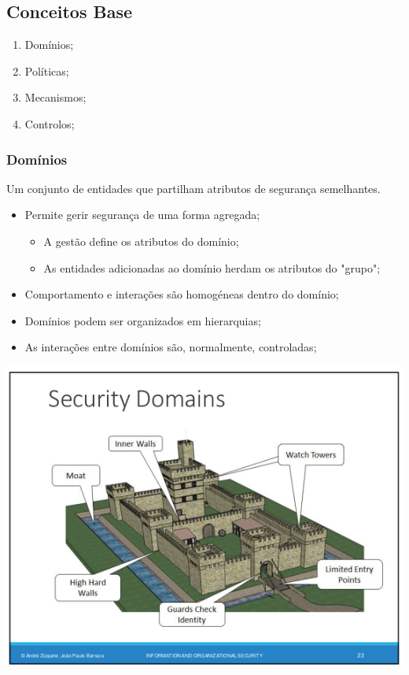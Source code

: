 \documentclass{article}
\begin{document}
\subsection{Conceitos Base}

\begin{enumerate}
  \item Domínios;
  \item Políticas;
  \item Mecanismos;
  \item Controlos;
\end{enumerate}

\subsubsection{Domínios}

Um conjunto de entidades que partilham atributos de segurança semelhantes.

\begin{flushleft}
  \begin{itemize}
    \item Permite gerir segurança de uma forma agregada;
    \begin{itemize}
      \item A gestão define os atributos do domínio;
      \item As entidades adicionadas ao domínio herdam os atributos do "grupo";
    \end{itemize}
    \item Comportamento e interações são homogéneas dentro do domínio;
    \item Domínios podem ser organizados em hierarquias;
    \item As interações entre domínios são, normalmente, controladas;
  \end{itemize}
\end{flushleft}

\begin{center}
  \includegraphics[scale=0.3]{4}
\end{center}
\end{document}

